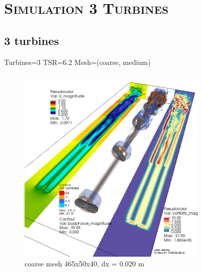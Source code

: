 \documentclass[xcolor=x11names,compress]{beamer}
\begin{document}
\section{\scshape Simulation 3 Turbines}

\subsection{3 turbines}

	\begin{frame}{Turbines=3  TSR=6.2  Mesh=(coarse, medium)}
		
		\begin{columns}
		    
		    \begin{column}{0.6\textwidth}
		        \begin{figure}[p]
				    \centering
				    \includegraphics[width=0.8\textwidth]{figures/fastFlume__Turbines=3_TSR=6p2_Layout=offset_Mesh=coarse.png}
				    \caption{\scriptsize{coarse mesh 465x50x40, dx = 0.020 m}}
				\end{figure}

		    \end{column}
		    

\end{columns}
\end{frame}
\end{document}
